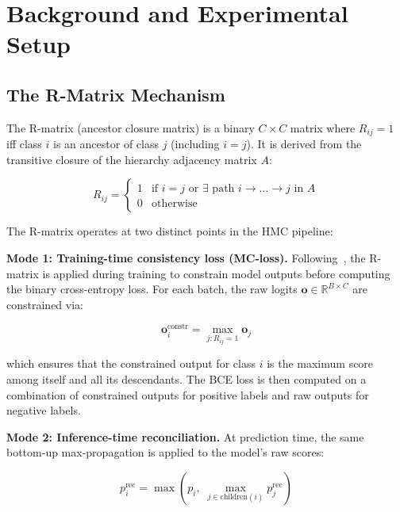 \section{Background and Experimental Setup}
\label{sec:background}

\subsection{The R-Matrix Mechanism}

The R-matrix (ancestor closure matrix) is a binary $C \times C$ matrix
where $R_{ij} = 1$ iff class $i$ is an ancestor of class $j$ (including
$i = j$). It is derived from the transitive closure of the hierarchy
adjacency matrix $A$:

\begin{equation}
R_{ij} = \begin{cases}
1 & \text{if } i = j \text{ or } \exists \text{ path } i \rightarrow \ldots \rightarrow j \text{ in } A \\
0 & \text{otherwise}
\end{cases}
\label{eq:rdef}
\end{equation}

The R-matrix operates at two distinct points in the HMC pipeline:

\textbf{Mode 1: Training-time consistency loss (MC-loss).}
Following~\cite{giunchiglia2018hmc}, the R-matrix is applied during
training to constrain model outputs before computing the binary
cross-entropy loss. For each batch, the raw logits $\mathbf{o} \in
\mathbb{R}^{B \times C}$ are constrained via:

\begin{equation}
\mathbf{o}^{\text{constr}}_i = \max_{j: R_{ij}=1} \mathbf{o}_j
\label{eq:constr}
\end{equation}

which ensures that the constrained output for class $i$ is the maximum
score among itself and all its descendants. The BCE loss is then
computed on a combination of constrained outputs for positive labels and
raw outputs for negative labels.

\textbf{Mode 2: Inference-time reconciliation.}
At prediction time, the same bottom-up max-propagation is applied to the
model's raw scores:

\begin{equation}
p_i^{\text{rec}} = \max\left(p_i,\; \max_{j \in \text{children}(i)} p_j^{\text{rec}}\right)
\label{eq:reconcile}
\end{equation}

